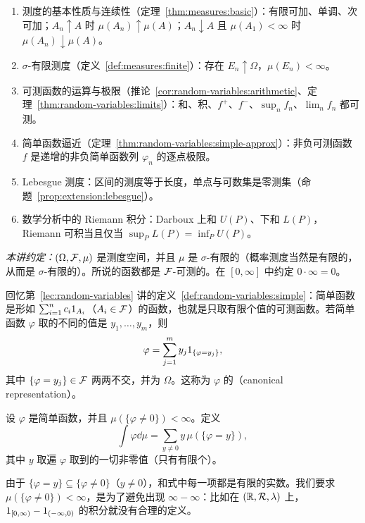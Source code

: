\begin{enumerate}
\item 测度的基本性质与连续性（定理~\ref{thm:measures:basic}）：有限可加、单调、次可加；$A_n\uparrow A$ 时 $\mu(A_n)\uparrow\mu(A)$；$A_n\downarrow A$ 且 $\mu(A_1)<\infty$ 时 $\mu(A_n)\downarrow\mu(A)$。
\item $\sigma$-有限测度（定义~\ref{def:measures:finite}）：存在 $E_n\uparrow\Omega$，$\mu(E_n)<\infty$。
\item 可测函数的运算与极限（推论~\ref{cor:random-variables:arithmetic}、定理~\ref{thm:random-variables:limits}）：和、积、$f^+$、$f^-$、$\sup_n f_n$、$\lim_nf_n$ 都可测。
\item 简单函数逼近（定理~\ref{thm:random-variables:simple-approx}）：非负可测函数 $f$ 是递增的非负简单函数列 $\varphi_n$ 的逐点极限。
\item Lebesgue 测度：区间的测度等于长度，单点与可数集是零测集（命题~\ref{prop:extension:lebesgue}）。
\item 数学分析中的 Riemann 积分：Darboux 上和 $U(P)$、下和 $L(P)$，Riemann 可积当且仅当 $\sup_PL(P)=\inf_PU(P)$。
\end{enumerate}

\emph{本讲约定：}$(\Omega,\mathcal{F},\mu)$ 是测度空间，并且 $\mu$ 是 $\sigma$-有限的（概率测度当然是有限的，从而是 $\sigma$-有限的）。所说的函数都是 $\mathcal{F}$-可测的。在 $[0,\infty]$ 中约定 $0\cdot\infty=0$。


回忆第~\ref{lec:random-variables} 讲的定义~\ref{def:random-variables:simple}：简单函数是形如 $\sum_{i=1}^nc_i1_{A_i}$（$A_i\in\mathcal{F}$）的函数，也就是只取有限个值的可测函数。若简单函数 $\varphi$ 取的不同的值是 $y_1,\dots,y_m$，则
\[
\varphi=\sum_{j=1}^my_j1_{\{\varphi=y_j\}},
\]
其中 $\{\varphi=y_j\}\in\mathcal{F}$ 两两不交，并为 $\Omega$。这称为 $\varphi$ 的（canonical representation）。

\begin{definition}[简单函数的积分]\label{def:integration:simple}
设 $\varphi$ 是简单函数，并且 $\mu(\{\varphi\neq0\})<\infty$。定义
\[
\int\varphi\dd\mu=\sum_{y\neq0}y\,\mu(\{\varphi=y\}),
\]
其中 $y$ 取遍 $\varphi$ 取到的一切非零值（只有有限个）。
\end{definition}

由于 $\{\varphi=y\}\subseteq\{\varphi\neq0\}$（$y\neq0$），和式中每一项都是有限的实数。我们要求 $\mu(\{\varphi\neq0\})<\infty$，是为了避免出现 $\infty-\infty$：比如在 $(\mathbb{R},\mathcal{R},\lambda)$ 上，$1_{[0,\infty)}-1_{(-\infty,0)}$ 的积分就没有合理的定义。

